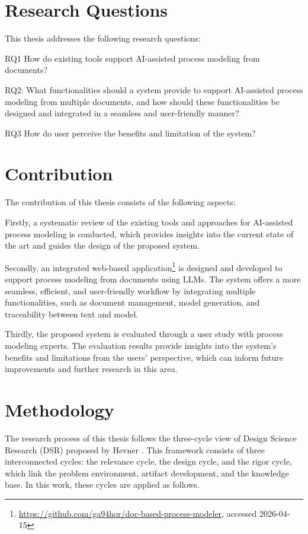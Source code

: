 \section{Research Questions}

\label{sec:intro:rq}

This thesis addresses the following research questions:

RQ1 How do existing tools support AI-assisted process modeling from documents?

RQ2: What functionalities should a system provide to support AI-assisted process modeling from multiple documents, and how should these functionalities be designed and integrated in a seamless and user-friendly manner?

RQ3 How do user perceive the benefits and limitation of the system?

\section{Contribution}
\label{sec:intro:con}
The contribution of this thesis consists of the following aspects:

Firstly, a systematic review of the existing tools and approaches for AI-assisted process modeling is conducted, which provides insights into the current state of the art and guides the design of the proposed system.

Secondly, an integrated web-based application\footnote{\url{https://github.com/ga94hor/doc-based-process-modeler}, accessed 2026-04-15} is designed and developed to support process modeling from documents using LLMs. The system offers a more seamless, efficient, and user-friendly workflow by integrating multiple functionalities, such as document management, model generation, and traceability between text and model.

Thirdly, the proposed system is evaluated through a user study with process modeling experts. The evaluation results provide insights into the system’s benefits and limitations from the users’ perspective, which can inform future improvements and further research in this area.

\section{Methodology}
\label{sec:intro:meth}
The research process of this thesis follows the three-cycle view of Design Science Research (DSR) proposed by Hevner \cite{hevner2007}. This framework consists of three interconnected cycles: the relevance cycle, the design cycle, and the rigor cycle, which link the problem environment, artifact development, and the knowledge base. In this work, these cycles are applied as follows.

